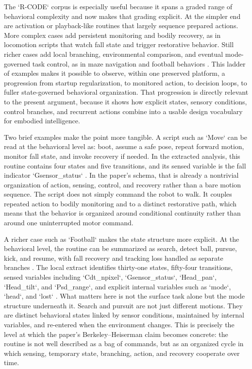\documentclass[11pt]{article}
\begin{document}
The `R-CODE` corpus is especially useful because it spans a graded range of behavioral complexity and now makes that grading explicit. At the simpler end are activation or playback-like routines that largely sequence prepared actions. More complex cases add persistent monitoring and bodily recovery, as in locomotion scripts that watch fall state and trigger restorative behavior. Still richer cases add local branching, environmental comparison, and eventual mode-governed task control, as in maze navigation and football behaviors \citep{tucker2026behavioral}. This ladder of examples makes it possible to observe, within one preserved platform, a progression from startup regularization, to monitored action, to decision loops, to fuller state-governed behavioral organization. That progression is directly relevant to the present argument, because it shows how explicit states, sensory conditions, control branches, and recurrent actions combine into a usable design vocabulary for embodied intelligence.

Two brief examples make the point more tangible. A script such as `Move` can be read at the behavioral level as: boot, assume a safe pose, repeat forward motion, monitor fall state, and invoke recovery if needed. In the extracted analysis, this routine contains four states and five transitions, and its sensed variable is the fall indicator `Gsensor\_status` \citep{tucker2026behavioral}. In the paper's schema, that is already a nontrivial organization of action, sensing, control, and recovery rather than a bare motion sequence. The script does not simply command the robot to walk. It couples repeated action to bodily monitoring and to a distinct restorative path, which means that the behavior is organized around conditional continuity rather than around one uninterrupted motor command.

A richer case such as `Football` makes the state structure more explicit. At the behavioral level, the routine can be summarized as search, detect ball, pursue, kick, and resume, with fall recovery and tracking loss handled as separate branches \citep{tucker2026behavioral}. The local extract identifies thirty-one states, fifty-four transitions, sensed variables including `Cdt\_npixel`, `Gsensor\_status`, `Head\_pan`, `Head\_tilt`, and `Psd\_range`, and explicit internal variables such as `mode`, `head`, and `lost` \citep{tucker2026behavioral}. What matters here is not the surface task alone but the mode structure underneath it. Search and pursuit are not just different motions. They are distinct behavioral states linked by sensor conditions, maintained by internal variables, and re-entered when the environment changes. This is precisely the level at which the paper's Berkeley--Heiserman claim becomes concrete: the routine is not well described as a bag of commands, but as an organized cycle in which sensing, temporary state, branching, action, and recovery cooperate over time.
\end{document}
